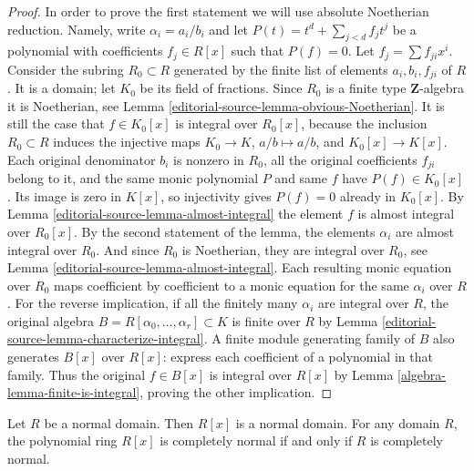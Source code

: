 \begin{proof}
\medskip\noindent
In order to prove the first statement we will use absolute Noetherian
reduction. Namely, write $\alpha_i = a_i / b_i$ and
let $P(t) = t^d + \sum_{j < d} f_j t^j$ be a polynomial
with coefficients $f_j \in R[x]$ such that $P(f) = 0$.
Let $f_j = \sum f_{ji}x^i$. Consider the subring
$R_0 \subset R$ generated by the finite list of elements
$a_i, b_i, f_{ji}$ of $R$. It is a domain; let
$K_0$ be its field of fractions. Since $R_0$ is a finite type
$\mathbf{Z}$-algebra it is Noetherian, see
Lemma \ref{editorial-source-lemma-obvious-Noetherian}. It is still
the case that $f \in K_0[x]$ is integral over $R_0[x]$,
because the inclusion $R_0\subset R$ induces the injective maps
$K_0\to K$, $a/b\mapsto a/b$, and $K_0[x]\to K[x]$.
Each original denominator $b_i$ is nonzero in $R_0$, all the
original coefficients $f_{ji}$ belong to it, and the same monic
polynomial $P$ and same $f$ have $P(f)\in K_0[x]$.
Its image is zero in $K[x]$, so injectivity gives $P(f)=0$
already in $K_0[x]$.
By Lemma \ref{editorial-source-lemma-almost-integral} the element
$f$ is almost integral over $R_0[x]$. By the second statement of
the lemma, the elements $\alpha_i$ are almost integral
over $R_0$. And since $R_0$ is Noetherian, they are
integral over $R_0$, see Lemma \ref{editorial-source-lemma-almost-integral}.
Each resulting monic equation over $R_0$ maps coefficient by
coefficient to a monic equation for the same $\alpha_i$ over $R$.
For the reverse implication, if all the finitely many $\alpha_i$
are integral over $R$, the original algebra
$B=R[\alpha_0,\ldots,\alpha_r]\subset K$ is finite over $R$
by Lemma \ref{editorial-source-lemma-characterize-integral}. A finite module
generating family of $B$ also generates $B[x]$ over $R[x]$:
express each coefficient of a polynomial in that family.
Thus the original $f\in B[x]$ is integral over $R[x]$ by
Lemma \ref{algebra-lemma-finite-is-integral}, proving the other implication.
\end{proof}

\begin{lemma}
\label{editorial-source-lemma-polynomial-domain-normal}
Let $R$ be a normal domain.
Then $R[x]$ is a normal domain. For any domain $R$, the polynomial
ring $R[x]$ is completely normal if and only if $R$ is completely normal.
\end{lemma}

